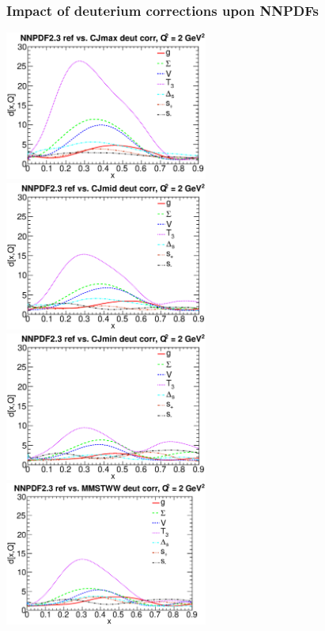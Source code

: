 \documentclass[10pt]{beamer}
\begin{document}
\begin{frame}
\frametitle{Impact of deuterium corrections upon NNPDFs}

 \includegraphics[width=0.5\textwidth]{distances-nnpdf23-deut-cjmax.eps}
 \includegraphics[width=0.5\textwidth]{distances-nnpdf23-deut-cjmid.eps}\\
 \includegraphics[width=0.5\textwidth]{distances-nnpdf23-deut-cjmin.eps}
 \includegraphics[width=0.5\textwidth]{distances-nnpdf23-deut-mmstww.eps}
\end{frame}
\end{document}
